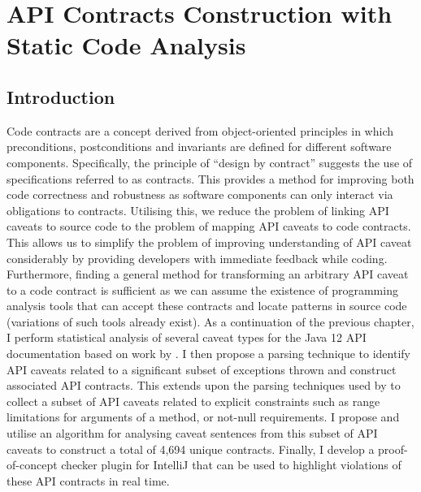 \chapter{API Contracts Construction with Static Code Analysis}
\label{cha:codeAnalysis}

\section{Introduction}
\label{sec:contract-intro}
Code contracts are a concept derived from object-oriented principles in which preconditions, postconditions and invariants are defined for different software components. Specifically, the principle of ``design by contract'' suggests the use of specifications referred to as contracts. This provides a method for improving both code correctness and robustness as software components can only interact via obligations to contracts. Utilising this, we reduce the problem of linking API caveats to source code to the problem of mapping API caveats to code contracts. This allows us to simplify the problem of improving understanding of API caveat considerably by providing developers with immediate feedback while coding. Furthermore, finding a general method for transforming an arbitrary API caveat to a code contract is sufficient as we can assume the existence of programming analysis tools that can accept these contracts and locate patterns in source code (variations of such tools already exist). As a continuation of the previous chapter, I perform statistical analysis of several caveat types for the Java 12 API documentation based on work by \cite{zhou-directive}. I then propose a parsing technique to identify API caveats related to a significant subset of exceptions thrown and construct associated API contracts. This extends upon the parsing techniques used by \citeauthor{zhou-directive} to collect a subset of API caveats related to explicit constraints such as range limitations for arguments of a method, or not-null requirements. I propose and utilise an algorithm for analysing caveat sentences from this subset of API caveats to construct a total of 4,694 unique contracts. Finally, I develop a proof-of-concept checker plugin for IntelliJ that can be used to highlight violations of these API contracts in real time. \\

